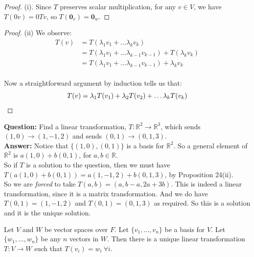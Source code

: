 \documentclass[twoside]{scrartcl}
\begin{document}
\begin{proof} (i). Since $T$ preserves scalar multiplication, for any $v \in V$, we have $T(0v) = 0Tv$, so $T(\mathbf{0}_v) = \mathbf{0}_w$.

\end{proof}


\begin{proof} 
(ii)
We observe:
\[
\begin{aligned}
T(v) &= T(\lambda_1v_1 + \dots \lambda_kv_k)\\
&= T(\lambda_1v_1 + \dots \lambda_{k-1}v_{k-1}) + T(\lambda_kv_k)\\
&= T(\lambda_1v_1 + \dots \lambda_{k-1}v_{k-1}) + \lambda_kv_k\\
\end{aligned}\]

Now a straightforward argument by induction tells us that: \[T(v) = \lambda_1T(v_1) + \lambda_2T(v_2) + \dots \lambda_kT(v_k) \qedhere\]
\end{proof}

\begin{example} \textbf{Question:} Find a linear transformation, $T: \mathbb{R}^2 \to \mathbb{R}^3$, which sends $(1,0) \to (1,-1,2)$ and sends $(0,1) \to (0,1,3)$.\\

\textbf{Answer:} Notice that $\{(1,0), (0,1)\}$ is a basis for $\mathbb{R}^2$. So a general element of $\mathbb{R}^2$ is $a(1,0) + b(0,1)$, for $a,b \in \mathbb{R}$. \\

So if $T$ is a solution to the question, then we must have $T(a(1,0) + b(0,1)) = a(1,-1,2) + b(0,1,3)$, by Proposition 24(ii). \\

So we are \emph{forced} to take $T(a,b) = (a,b-a,2a+3b)$. This is indeed a linear transformation, since it is a matrix transformation. And we do have $T(0,1) = (1,-1,2)$ and $T(0,1) = (0,1,3)$ as required. So this is a solution and it is the unique solution.
\end{example}\vspace*{10pt}


\begin{proposition}Let $V$ and $W$ be vector spaces over $F$. Let $\{v_1,\dots,v_n\}$ be a basis for $V$. Let $\{w_1,\dots,w_n\}$ be any $n$ vectors in $W$. Then there is a unique linear transformation $T: V \to W$ such that $T(v_i) = w_i ~\forall i$.	
\end{proposition}\vspace*{10pt}
\end{document}
